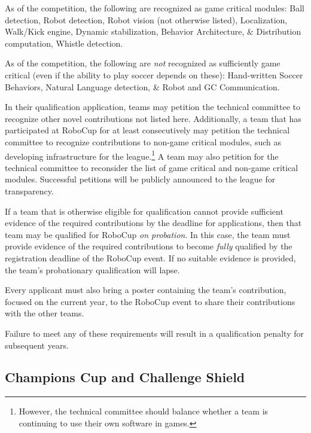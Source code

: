 As of the \RCYear competition, the following are recognized as game critical modules:
Ball detection, Robot detection, Robot vision (not otherwise listed), Localization, Walk/Kick engine, Dynamic stabilization, Behavior Architecture, \& Distribution computation, Whistle detection.

As of the \RCYear competition, the following are \textit{not} recognized as sufficiently game critical (even if the ability to play soccer depends on these):
Hand-written Soccer Behaviors, Natural Language detection, \& Robot and GC Communication.

In their qualification application, teams may petition the technical committee to recognize other novel contributions not listed here.
Additionally, a team that has participated at RoboCup for at least \NovelContributionTime consecutively may petition the technical committee to recognize contributions to non-game critical modules, such as developing infrastructure for the league.\footnote{
  However, the technical committee should balance whether a team is continuing to use their own software in games.
}
A team may also petition for the technical committee to reconsider the list of game critical and non-game critical modules.
Successful petitions will be publicly announced to the league for transparency.

If a team that is otherwise eligible for qualification cannot provide sufficient evidence of the required contributions by the deadline for applications, then that team may be qualified for RoboCup \textit{on probation}.
In this case, the team must provide evidence of the required contributions to become \textit{fully} qualified by the registration deadline of the RoboCup event.
If no suitable evidence is provided, the team's probationary qualification will lapse.

Every applicant must also bring a poster containing the team's contribution, focused on the current year, to the RoboCup event to share their contributions with the other teams.

Failure to meet any of these requirements will result in a qualification penalty for subsequent years.

\subsection{Champions Cup and Challenge Shield}
\label{sec:cc_and_cs}

